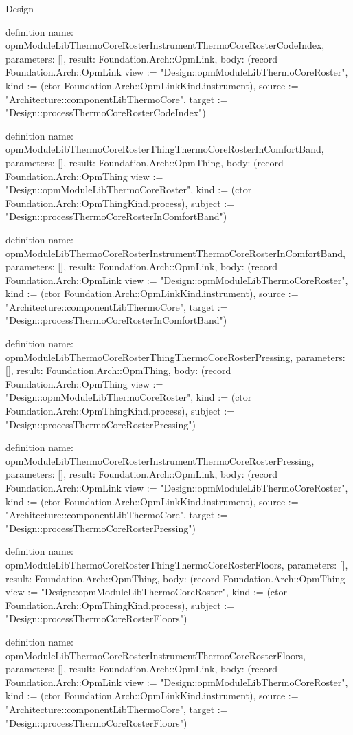 \begin{lexlean}{Design}
\begin{semanticmodule}
definition{
  name: opmModuleLibThermoCoreRosterInstrumentThermoCoreRosterCodeIndex,
  parameters: [],
  result: Foundation.Arch::OpmLink,
  body: (record Foundation.Arch::OpmLink {view := "Design::opmModuleLibThermoCoreRoster", kind := (ctor Foundation.Arch::OpmLinkKind.instrument), source := "Architecture::componentLibThermoCore", target := "Design::processThermoCoreRosterCodeIndex"})
}

definition{
  name: opmModuleLibThermoCoreRosterThingThermoCoreRosterInComfortBand,
  parameters: [],
  result: Foundation.Arch::OpmThing,
  body: (record Foundation.Arch::OpmThing {view := "Design::opmModuleLibThermoCoreRoster", kind := (ctor Foundation.Arch::OpmThingKind.process), subject := "Design::processThermoCoreRosterInComfortBand"})
}

definition{
  name: opmModuleLibThermoCoreRosterInstrumentThermoCoreRosterInComfortBand,
  parameters: [],
  result: Foundation.Arch::OpmLink,
  body: (record Foundation.Arch::OpmLink {view := "Design::opmModuleLibThermoCoreRoster", kind := (ctor Foundation.Arch::OpmLinkKind.instrument), source := "Architecture::componentLibThermoCore", target := "Design::processThermoCoreRosterInComfortBand"})
}

definition{
  name: opmModuleLibThermoCoreRosterThingThermoCoreRosterPressing,
  parameters: [],
  result: Foundation.Arch::OpmThing,
  body: (record Foundation.Arch::OpmThing {view := "Design::opmModuleLibThermoCoreRoster", kind := (ctor Foundation.Arch::OpmThingKind.process), subject := "Design::processThermoCoreRosterPressing"})
}

definition{
  name: opmModuleLibThermoCoreRosterInstrumentThermoCoreRosterPressing,
  parameters: [],
  result: Foundation.Arch::OpmLink,
  body: (record Foundation.Arch::OpmLink {view := "Design::opmModuleLibThermoCoreRoster", kind := (ctor Foundation.Arch::OpmLinkKind.instrument), source := "Architecture::componentLibThermoCore", target := "Design::processThermoCoreRosterPressing"})
}

definition{
  name: opmModuleLibThermoCoreRosterThingThermoCoreRosterFloors,
  parameters: [],
  result: Foundation.Arch::OpmThing,
  body: (record Foundation.Arch::OpmThing {view := "Design::opmModuleLibThermoCoreRoster", kind := (ctor Foundation.Arch::OpmThingKind.process), subject := "Design::processThermoCoreRosterFloors"})
}

definition{
  name: opmModuleLibThermoCoreRosterInstrumentThermoCoreRosterFloors,
  parameters: [],
  result: Foundation.Arch::OpmLink,
  body: (record Foundation.Arch::OpmLink {view := "Design::opmModuleLibThermoCoreRoster", kind := (ctor Foundation.Arch::OpmLinkKind.instrument), source := "Architecture::componentLibThermoCore", target := "Design::processThermoCoreRosterFloors"})
}


\end{semanticmodule}
\end{lexlean}
